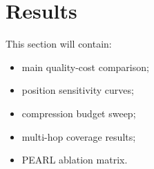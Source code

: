 \section{Results}

This section will contain:

\begin{itemize}
  \item main quality-cost comparison;
  \item position sensitivity curves;
  \item compression budget sweep;
  \item multi-hop coverage results;
  \item PEARL ablation matrix.
\end{itemize}
